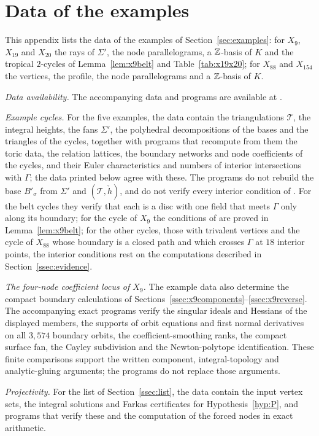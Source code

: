 \section{Data of the examples}\label{app:data}
This appendix lists the data of the examples of Section~\ref{sec:examples}: for $X_9$, $X_{19}$ and $X_{20}$ the rays of
$\Sigma'$, the node parallelograms, a $\mathbb Z$-basis of $K$ and the tropical $2$-cycles of Lemma~\ref{lem:x9belt} and
Table~\ref{tab:x19x20}; for $X_{88}$ and $X_{154}$ the vertices, the profile, the node parallelograms and a $\mathbb Z$-basis of
$K$.

\emph{Data availability.} The accompanying data and programs are available at \coderepo.

\emph{Example cycles.} For the five examples, the data contain the triangulations
$\mathcal T$, the integral heights, the fans $\Sigma'$, the polyhedral decompositions of the bases and the triangles of
the cycles, together with programs that recompute from them the toric data, the relation lattices, the boundary networks
and node coefficients of the cycles, and their Euler characteristics and numbers of interior intersections with $\Gamma$;
the data printed below agree with these. The programs do not rebuild the base $B'_\sigma$ from $\Sigma'$ and
$(\mathcal T,\check h)$, and do not verify every interior condition of \cite[Def.~7.2]{CBM}. For the belt cycles they
verify that each is a disc with one field that meets $\Gamma$ only along its boundary; for the cycle of $X_9$ the
conditions of \cite[Def.~7.2]{CBM} are proved in Lemma~\ref{lem:x9belt}; for the other cycles, those with trivalent
vertices and the cycle of $X_{88}$ whose boundary is a closed path and which crosses $\Gamma$ at $18$ interior points, the
interior conditions rest on the computations described in Section~\ref{ssec:evidence}.

\emph{The four-node coefficient locus of $X_9$.} The example data also determine the compact boundary
calculations of Sections~\ref{ssec:x9components}--\ref{ssec:x9reverse}. The accompanying exact programs
verify the singular ideals and Hessians of the displayed members, the supports of orbit equations and first normal
derivatives on all $3{,}574$ boundary orbits, the coefficient-smoothing ranks, the compact surface fan, the Cayley
subdivision and the Newton-polytope identification. These finite comparisons support the written component,
integral-topology and analytic-gluing arguments; the programs do not replace those arguments.

\emph{Projectivity.} For the list of Section~\ref{ssec:list}, the data contain the input vertex sets, the integral
solutions and Farkas certificates for Hypothesis~\ref{hyp:P}, and programs that verify these and the computation of
the forced nodes in exact arithmetic.

